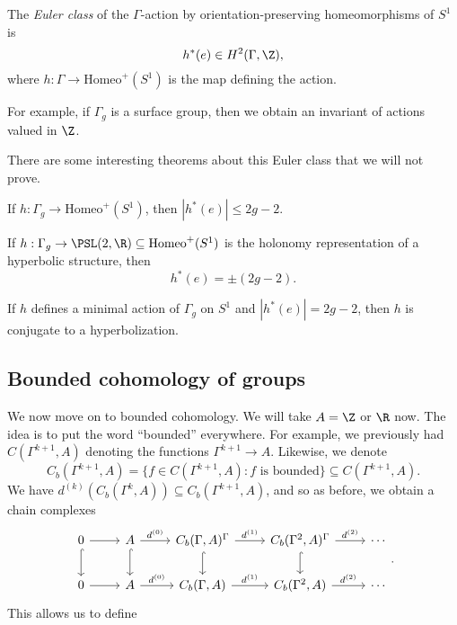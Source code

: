 \documentclass[a4paper]{article}
\newcommand\Homeo{\mathrm{Homeo}}
\begin{document}
\begin{defi}
  The \emph{Euler class} of the $\Gamma$-action by orientation-preserving homeomorphisms of $S^1$ is
  \[
    h^*(e) \in H^2(\Gamma, \Z),
  \]
  where $h: \Gamma \to \Homeo^+(S^1)$ is the map defining the action.
\end{defi}

For example, if $\Gamma_g$ is a surface group, then we obtain an invariant of actions valued in $\Z$.

There are some interesting theorems about this Euler class that we will not prove.
\begin{thm}
  If $h: \Gamma_g \to \Homeo^+(S^1)$, then $|h^*(e)| \leq 2g - 2$.
\end{thm}

\begin{thm}
  If $h: \Gamma_g \to \PSL(2, \R) \subseteq \Homeo^+(S^1)$ is the holonomy representation of a hyperbolic structure, then
  \[
    h^*(e) = \pm (2g - 2).
  \]
\end{thm}

\begin{thm}[Matsumoko, 1986]
  If $h$ defines a minimal action of $\Gamma_g$ on $S^1$ and $|h^*(e)| = 2g - 2$, then $h$ is conjugate to a hyperbolization.
\end{thm}

\subsection{Bounded cohomology of groups}
We now move on to bounded cohomology. We will take $A = \Z$ or $\R$ now. The idea is to put the word ``bounded'' everywhere. For example, we previously had $C(\Gamma^{k + 1}, A)$ denoting the functions $\Gamma^{k + 1} \to A$. Likewise, we denote
\[
  C_b(\Gamma^{k + 1}, A) = \{f \in C(\Gamma^{k + 1}, A) : f\text{ is bounded}\} \subseteq C(\Gamma^{k + 1}, A).
\]
We have $d^{(k)}(C_b(\Gamma^k, A)) \subseteq C_b(\Gamma^{k + 1}, A)$, and so as before, we obtain a chain complexes
\[
  \begin{tikzcd}
    0 \ar[r] \ar[d, hook] & A \ar[r, "d^{(0)}"] \ar[d, hook] & C_b(\Gamma, A)^\Gamma \ar[r, "d^{(1)}"] \ar[d, hook] & C_b(\Gamma^2, A)^\Gamma \ar[r, "d^{(2)}"]\ar[d, hook]  & \cdots\\
    0 \ar[r] & A \ar[r, "d^{(0)}"] & C_b(\Gamma, A) \ar[r, "d^{(1)}"] & C_b(\Gamma^2, A) \ar[r, "d^{(2)}"] & \cdots
  \end{tikzcd}.
\]
This allows us to define
\end{document}
